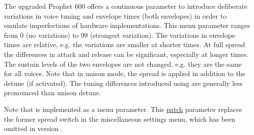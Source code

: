 The upgraded Prophet 600 offers a continuous parameter to introduce deliberate variations in voice tuning and envelope times (both envelopes) in  order to emulate imperfections of hardware implementations. This menu parameter \vintage ranges from 0 (no variations) to 99 (strongest variation). The variations in envelope times are relative, e.g. the variations are smaller at shorter times. At full spread the differences in attack and release can be significant, especially at longer times. The sustain levels of the two envelopes are not changed, e.g. they are the same for all voices. Note that in unison mode, the spread is applied in addition to the detune (if activated). The tuning differences introduced using \vintage are generally less pronounced than unison detune.

Note that \vintage is implemented as a menu parameter. This \underline{patch} parameter replaces the former spread switch in the miscellaneous settings menu, which has been omitted in version \version.
